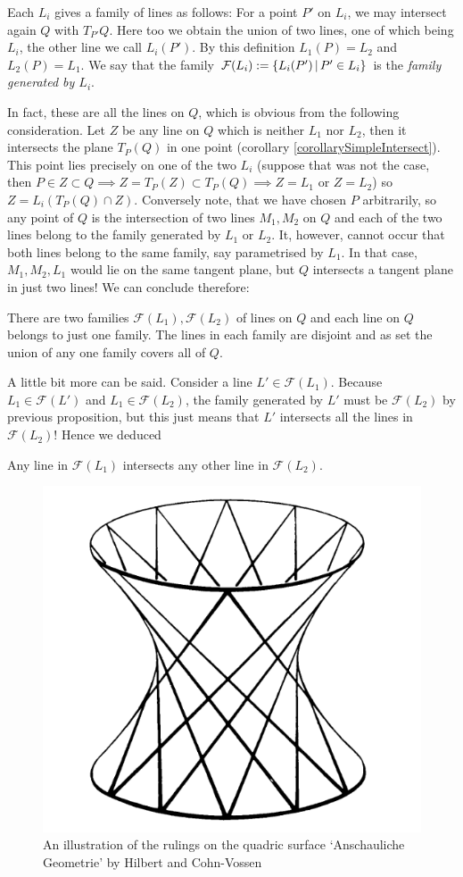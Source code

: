 Each $L_i$ gives a family of lines as follows: For a point $P'$ on $L_i$, we may intersect again $Q$ with $T_{P'}Q$.
Here too we obtain the union of two lines, one of which being $L_i$, the other line we call $L_i(P')$.
By this definition $L_1(P) = L_2$ and $L_2(P) = L_1$.
We say that the family $\mathcal F(L_i) := \left\lbrace L_i(P') \,|\, P' \in L_i\right\rbrace$ is the \emph{family generated by $L_i$}.

In fact, these are all the lines on $Q$, which is obvious from the following consideration.
Let $Z$ be any line on $Q$ which is neither $L_1$ nor $L_2$, then it intersects the plane $T_P(Q)$ in one point (corollary \ref{corollarySimpleIntersect}).
This point lies precisely on one of the two $L_i$ (suppose that was not the case, then $P \in Z \subset Q \implies Z = T_P(Z) \subset T_P(Q) \implies Z=L_1 \text{ or } Z=L_2$) so $Z = L_i(T_P(Q)\cap Z)$.
Conversely note, that we have chosen $P$ arbitrarily, so any point of $Q$ is the intersection of two lines $M_1,M_2$ on $Q$ and each of the two lines belong to the family generated by $L_1$ or $L_2$.
It, however, cannot occur that both lines belong to the same family, say parametrised by $L_1$. In that case, $M_1,M_2,L_1$ would lie on the same tangent plane, but $Q$ intersects a tangent plane in just two lines!
We can conclude therefore:
\begin{proposition}
There are two families $\mathcal F(L_1), \mathcal F(L_2)$ of lines on $Q$ and each line on $Q$ belongs to just one family.
The lines in each family are disjoint and as set the union of any one family covers all of $Q$.
\end{proposition}
A little bit more can be said.
Consider a line $L' \in \mathcal F(L_1)$.
Because $L_1 \in \mathcal F(L')$ and $L_1 \in \mathcal F(L_2)$, the family generated by $L'$ must be $\mathcal F(L_2)$ by previous proposition, but this just means that $L'$ intersects all the lines in $\mathcal F(L_2)$!
Hence we deduced
\begin{corollary} \label{corollaryMutualIntersect}
Any line in $\mathcal F(L_1)$ intersects any other line in $\mathcal F(L_2)$.
\end{corollary}

\begin{figure}
\center
\includegraphics[width=.4\textwidth]{img/ruledsurface-hilbert.png}
\caption{An illustration of the rulings on the quadric surface `Anschauliche Geometrie' by Hilbert and Cohn-Vossen \cite[figure 17]{cohn1990geometry}}
\end{figure}

